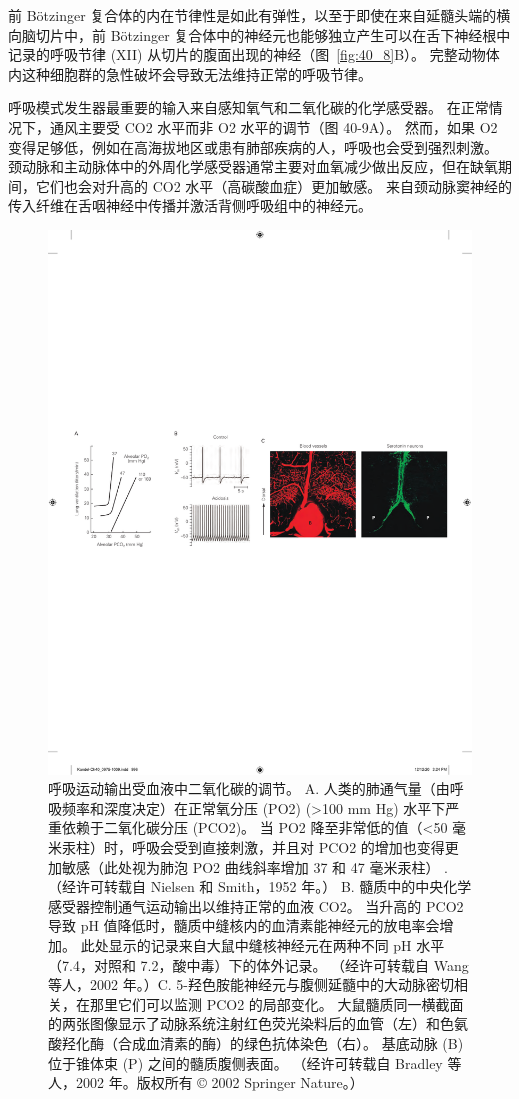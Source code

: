 前 Bötzinger 复合体的内在节律性是如此有弹性，以至于即使在来自延髓头端的横向脑切片中，前 Bötzinger 复合体中的神经元也能够独立产生可以在舌下神经根中记录的呼吸节律 (XII) 从切片的腹面出现的神经（图~\ref{fig:40_8}B）。
完整动物体内这种细胞群的急性破坏会导致无法维持正常的呼吸节律。


呼吸模式发生器最重要的输入来自感知氧气和二氧化碳的化学感受器。
在正常情况下，通风主要受 CO2 水平而非 O2 水平的调节（图 40-9A）。
然而，如果 O2 变得足够低，例如在高海拔地区或患有肺部疾病的人，呼吸也会受到强烈刺激。
颈动脉和主动脉体中的外周化学感受器通常主要对血氧减少做出反应，但在缺氧期间，它们也会对升高的 CO2 水平（高碳酸血症）更加敏感。
来自颈动脉窦神经的传入纤维在舌咽神经中传播并激活背侧呼吸组中的神经元。


\begin{figure}[htbp]
	\centering
	\includegraphics[width=0.65\linewidth]{chap40/fig_40_9}
	\caption{呼吸运动输出受血液中二氧化碳的调节。 A. 人类的肺通气量（由呼吸频率和深度决定）在正常氧分压 (PO2) (>100 mm Hg) 水平下严重依赖于二氧化碳分压 (PCO2)。 当 PO2 降至非常低的值（<50 毫米汞柱）时，呼吸会受到直接刺激，并且对 PCO2 的增加也变得更加敏感（此处视为肺泡 PO2 曲线斜率增加 37 和 47 毫米汞柱） . （经许可转载自 Nielsen 和 Smith，1952 年。） B. 髓质中的中央化学感受器控制通气运动输出以维持正常的血液 CO2。 当升高的 PCO2 导致 pH 值降低时，髓质中缝核内的血清素能神经元的放电率会增加。 此处显示的记录来自大鼠中缝核神经元在两种不同 pH 水平（7.4，对照和 7.2，酸中毒）下的体外记录。 （经许可转载自 Wang 等人，2002 年。）C. 5-羟色胺能神经元与腹侧延髓中的大动脉密切相关，在那里它们可以监测 PCO2 的局部变化。 大鼠髓质同一横截面的两张图像显示了动脉系统注射红色荧光染料后的血管（左）和色氨酸羟化酶（合成血清素的酶）的绿色抗体染色（右）。 基底动脉 (B) 位于锥体束 (P) 之间的髓质腹侧表面。 （经许可转载自 Bradley 等人，2002 年。版权所有 © 2002 Springer Nature。）}
	\label{fig:40_9}
\end{figure}


